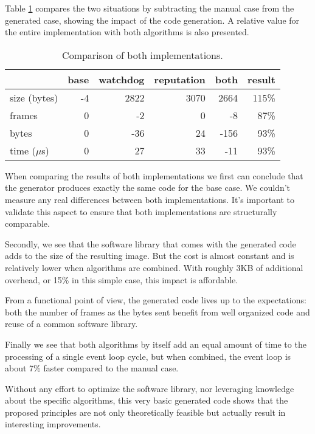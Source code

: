 \documentclass[conference]{IEEEtran}
\begin{document}
Table \ref{tbl:summary} compares the two situations by subtracting the manual
case from the generated case, showing the impact of the code generation. A
relative value for the entire implementation with both algorithms is also
presented.

\begin{table}[H]
  \centering
  \begin{tabular}{lrrrrr}
  \hline
                & base & watchdog & reputation & both  & result \\
  \hline
  size (bytes)  & -4    & 2822     & 3070       & 2664  & 115\%  \\
  frames        & 0     & -2       & 0          & -8    & 87\%   \\
  bytes         & 0     & -36      & 24         & -156  & 93\%   \\
  time ($\mu$s) & 0     & 27       & 33         & -11   & 93\%   \\
  \hline
  \end{tabular}
  \caption{Comparison of both implementations.}
  \label{tbl:summary}
\end{table}

When comparing the results of both implementations we first can conclude that
the generator produces exactly the same code for the base case. We couldn't
measure any real differences between both implementations. It's important to
validate this aspect to ensure that both implementations are structurally
comparable.

Secondly, we see that the software library that comes with the generated code
adds to the size of the resulting image. But the cost is almost constant and is
relatively lower when algorithms are combined. With roughly 3KB of additional
overhead, or 15\% in this simple case, this impact is affordable.

From a functional point of view, the generated code lives up to the
expectations: both the number of frames as the bytes sent benefit from well
organized code and reuse of a common software library.

Finally we see that both algorithms by itself add an equal amount of time to
the processing of a single event loop cycle, but when combined, the event loop
is about 7\% faster compared to the manual case.

Without any effort to optimize the software library, nor leveraging knowledge
about the specific algorithms, this very basic generated code shows that the
proposed principles are not only theoretically feasible but actually result in
interesting improvements.
\end{document}
